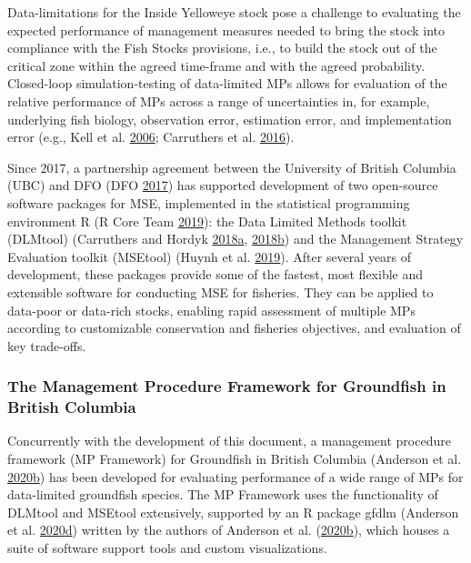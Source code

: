 \documentclass[11pt]{book}
\begin{document}
Data-limitations for the Inside Yelloweye stock pose a challenge to evaluating the expected performance of management measures needed to bring the stock into compliance with the Fish Stocks provisions, i.e., to build the stock out of the critical zone within the agreed time-frame and with the agreed probability. Closed-loop simulation-testing of data-limited MPs allows for evaluation of the relative performance of MPs across a range of uncertainties in, for example, underlying fish biology, observation error, estimation error, and implementation error (e.g., Kell et al. \protect\hyperlink{ref-kell2006}{2006}; Carruthers et al. \protect\hyperlink{ref-carruthers2016}{2016}).

Since 2017, a partnership agreement between the University of British Columbia (UBC) and DFO (DFO \protect\hyperlink{ref-dfo_dlmtool_2017}{2017}) has supported development of two open-source software packages for MSE, implemented in the statistical programming environment R (R Core Team \protect\hyperlink{ref-r2019}{2019}): the Data Limited Methods toolkit (DLMtool) (Carruthers and Hordyk \protect\hyperlink{ref-carruthers2018}{2018}\protect\hyperlink{ref-carruthers2018}{a}, \protect\hyperlink{ref-carruthers_hordyk_2018}{2018}\protect\hyperlink{ref-carruthers_hordyk_2018}{b}) and the Management Strategy Evaluation toolkit (MSEtool) (Huynh et al. \protect\hyperlink{ref-huynh_msetool_2019}{2019}). After several years of development, these packages provide some of the fastest, most flexible and extensible software for conducting MSE for fisheries. They can be applied to data-poor or data-rich stocks, enabling rapid assessment of multiple MPs according to customizable conservation and fisheries objectives, and evaluation of key trade-offs.

\hypertarget{sec:introduction-mp-framework}{%
\subsubsection{The Management Procedure Framework for Groundfish in British Columbia}\label{sec:introduction-mp-framework}}

Concurrently with the development of this document, a management procedure framework (MP Framework) for Groundfish in British Columbia (Anderson et al. \protect\hyperlink{ref-anderson2020gfmp}{2020}\protect\hyperlink{ref-anderson2020gfmp}{b}) has been developed for evaluating performance of a wide range of MPs for data-limited groundfish species. The MP Framework uses the functionality of DLMtool and MSEtool extensively, supported by an R package gfdlm (Anderson et al. \protect\hyperlink{ref-gfdlm}{2020}\protect\hyperlink{ref-gfdlm}{d}) written by the authors of Anderson et al. (\protect\hyperlink{ref-anderson2020gfmp}{2020}\protect\hyperlink{ref-anderson2020gfmp}{b}), which houses a suite of software support tools and custom visualizations.
\end{document}
